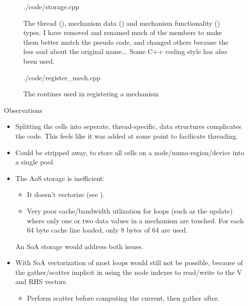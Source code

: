 \begin{figure}
\begin{shaded}
 {./code/storage.cpp}
\end{shaded}
\label{lst:NrnThreadInfo}
\caption{The thread (), mechanism data () and mechanism functionality () types. I have removed and renamed much of the members to make them better match the pseudo code, and changed others because the less said about the original name... Some C++ coding style has also been used.}
\end{figure}

\begin{figure}
\begin{shaded}
 {./code/register_mech.cpp}
\end{shaded}
\label{lst:register_mech}
\caption{The routines used in registering a mechanism}
\end{figure}


\noindent
Observations
\begin{itemize}
\item
    Splitting the cells into seperate, thread-specific, data structures complicates the code. This feels like it was added at some point to facilicate threading.
\item
    Could be stripped away, to store all cells on a node/numa-region/device into a single pool.
\item
    The AoS storage is inefficient:
    \begin{itemize}
    \item
        It doesn't vectorize (see ).
    \item
        Very poor cache/bandwidth utlization for loops (such as the  update) where only one or two data values in a mechanism are touched. For each 64 byte cache line loaded, only 8 bytes of 64 are used.
    \end{itemize}
    An SoA storage would address both issues.
\item
    With SoA vectorization of most loops would still not be possible, because of the gather/scatter implicit in using the node indexes to read/write to the V and RHS vectors.
    \begin{itemize}
    \item
        Perform scatter before computing the current, then gather after.
    \end{itemize}
\end{itemize}

